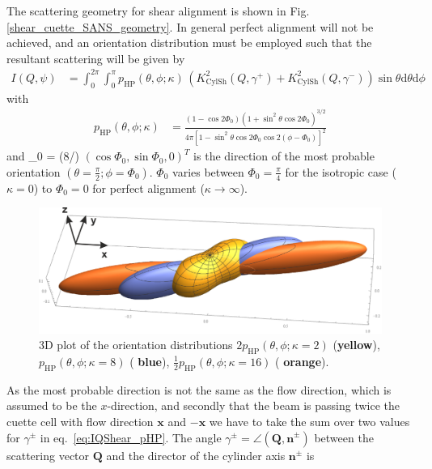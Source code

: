 The scattering geometry for shear alignment is shown in Fig.
\ref{shear_cuette_SANS_geometry}. In general perfect alignment
will not be achieved, and an orientation distribution must be
employed such that the resultant scattering will be given by
\begin{align}
I(Q,\psi) &= \int_0^{2\pi} \int_0^\pi
p_\mathrm{HP}(\theta,\phi;\kappa)\, \left(K^2_\text{CylSh}(Q,\gamma^+)+K^2_\text{CylSh}(Q,\gamma^-)
\right) \sin\theta \mathrm{d}\theta \mathrm{d}\phi
\label{eq:IQShear_pHP}
\end{align}
with
\begin{align}
p_\mathrm{HP}(\theta,\phi;\kappa) & = \frac{(1-\cos
2\varPhi_0)(1+\sin^2\theta\cos 2\varPhi_0)^{3/2}}{4\pi\left[
1-\sin^2\theta\cos 2\varPhi_0\cos 2(\phi-\varPhi_0)\right]^2}
\end{align}
and
\varPhi_0 = \arctan(8/\kappa)
\EE
$(\cos \varPhi_0,\sin \varPhi_0,0)^T$
is the direction of the most probable orientation $(\theta=\frac{\pi}{2};\phi=\varPhi_0)$. $\varPhi_0$ varies between $\varPhi_0=\frac{\pi}{4}$ for the isotropic case ($\kappa=0$)  to $\varPhi_0=0$ for perfect alignment ($\kappa\rightarrow \infty$).
\begin{figure}[htb]
\begin{center}
\includegraphics[width=\textwidth]{../images/form_factor/cylindrical_obj/pHP3D.png}
\end{center}
\caption{3D plot of the orientation distributions $2 p_\mathrm{HP}(\theta,\phi;\kappa={2})$ ({\bf \color[rgb]{1.0, 0.85, 0.0}yellow}), $p_\mathrm{HP}(\theta,\phi;\kappa{=}8)$ ({\bf\color[rgb]{0.36, 0.57, 0.9} blue}), $\frac12 p_\mathrm{HP}(\theta,\phi;\kappa{=}16)$ ({\bf\color[rgb]{1.0, 0.5, 0.0} orange}).} \label{fig:pHP3D}
\end{figure}
As the most probable direction is not the same as the flow direction, which is assumed to be the $x$-direction, and secondly that the beam is passing twice the cuette cell with flow direction $\mathbf{x}$ and $-\mathbf{x}$ we have to take the sum over two values for $\gamma^\pm$ in eq.\ \ref{eq:IQShear_pHP}. The angle $\gamma^\pm = \angle(\mathbf{Q,n}^\pm)$ between the scattering vector $\mathbf{Q}$ and the director of the cylinder axis $\mathbf{n}^\pm$ is
